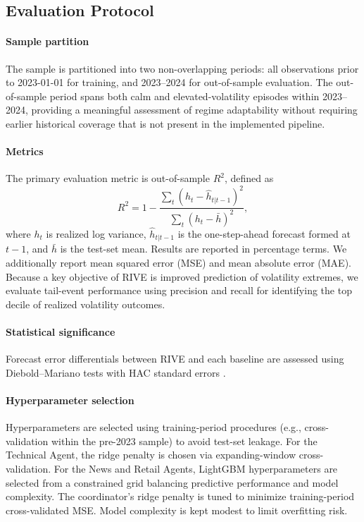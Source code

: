 \documentclass[review]{elsarticle}
\begin{document}
\subsection{Evaluation Protocol}\label{evaluation-protocol}

\paragraph{Sample partition}
The sample is partitioned into two non-overlapping periods: all observations prior to 2023-01-01 for training, and 2023--2024 for out-of-sample evaluation. %
The out-of-sample period spans both calm and elevated-volatility episodes within 2023--2024, providing a meaningful assessment of regime adaptability without requiring earlier historical coverage that is not present in the implemented pipeline. %

\paragraph{Metrics}
The primary evaluation metric is out-of-sample $R^2$, defined as
\[
R^2 = 1 - \frac{\sum_t (h_t - \widehat{h}_{t|t-1})^2}{\sum_t (h_t - \bar{h})^2},
\]
where $h_t$ is realized log variance, $\widehat{h}_{t|t-1}$ is the one-step-ahead forecast formed at $t-1$, and $\bar{h}$ is the test-set mean. Results are reported in percentage terms. We additionally report mean squared error (MSE) and mean absolute error (MAE). Because a key objective of RIVE is improved prediction of volatility extremes, we evaluate tail-event performance using precision and recall for identifying the top decile of realized volatility outcomes.

\paragraph{Statistical significance}
Forecast error differentials between RIVE and each baseline are assessed using Diebold--Mariano tests with HAC standard errors \cite{diebold1995,newey1987}.

\paragraph{Hyperparameter selection}
Hyperparameters are selected using training-period procedures (e.g., cross-validation within the pre-2023 sample) to avoid test-set leakage. %
For the Technical Agent, the ridge penalty is chosen via expanding-window cross-validation. For the News and Retail Agents, LightGBM hyperparameters are selected from a constrained grid balancing predictive performance and model complexity. The coordinator's ridge penalty is tuned to minimize training-period cross-validated MSE. Model complexity is kept modest to limit overfitting risk.
\end{document}
